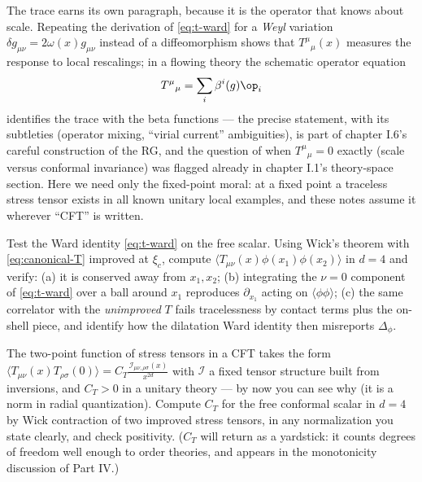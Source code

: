 The trace earns its own paragraph, because it is the operator that knows
about scale. Repeating the derivation of \eqref{eq:t-ward} for a \emph{Weyl}
variation $\delta g_{\mu\nu} = 2\omega(x) g_{\mu\nu}$ instead of a
diffeomorphism shows that $T^\mu{}_\mu(x)$ measures the response to local
rescalings; in a flowing theory the schematic operator equation
\begin{equation}
T^{\mu}{}_{\mu} = \sum_i \beta^i(g) \op_i
\label{eq:trace-beta}
\end{equation}
identifies the trace with the beta functions --- the precise statement, with
its subtleties (operator mixing, ``virial current'' ambiguities), is part of
chapter I.6's careful construction of the RG, and the question of when
$T^\mu{}_\mu = 0$ exactly (scale versus conformal invariance) was flagged
already in chapter I.1's theory-space section. Here we need only the fixed-point
moral: at a fixed point a traceless stress tensor exists in all known unitary
local examples, and these notes assume it wherever ``CFT'' is written.

\begin{exercise}[classic]
\label{exr:t-ward-check}
Test the Ward identity \eqref{eq:t-ward} on the free scalar. Using Wick's
theorem with \eqref{eq:canonical-T} improved at $\xi_c$, compute $\langle
T_{\mu\nu}(x) \phi(x_1)\phi(x_2)\rangle$ in $d=4$ and verify: (a) it is
conserved away from $x_1, x_2$; (b) integrating the $\nu = 0$ component
of \eqref{eq:t-ward} over a ball around $x_1$ reproduces $\partial_{x_1}$
acting on $\langle\phi\phi\rangle$; (c) the same correlator with the
\emph{unimproved} $T$ fails tracelessness by contact terms plus the on-shell
piece, and identify how the dilatation Ward identity then misreports
$\Delta_\phi$.
\end{exercise}

\begin{exercise}[medium]
\label{exr:tt-positivity}
The two-point function of stress tensors in a CFT takes the form $\langle
T_{\mu\nu}(x) T_{\rho\sigma}(0)\rangle = C_T \frac{\mathcal{I}_{\mu\nu,
\rho\sigma}(x)}{x^{2d}}$ with $\mathcal{I}$ a fixed tensor structure built
from inversions, and $C_T > 0$ in a unitary theory --- by now you can see why
(it is a norm in radial quantization). Compute $C_T$ for the free conformal
scalar in $d = 4$ by Wick contraction of two improved stress tensors, in any
normalization you state clearly, and check positivity. ($C_T$ will return as
a yardstick: it counts degrees of freedom well enough to order theories, and
appears in the monotonicity discussion of Part IV.)
\end{exercise}

